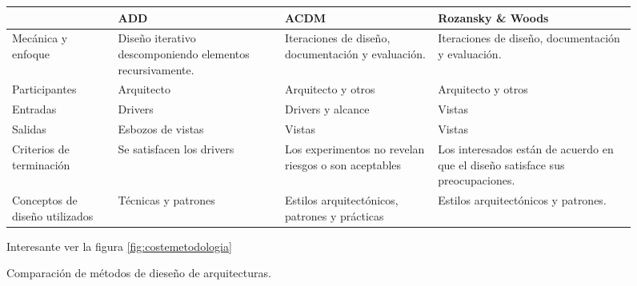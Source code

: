 \begin{figure}[h]
  \centering
  \begin{tabular}[h]{p{2.5cm} || p{3cm} | p{3cm} | p{5cm}}
    &\textbf{ADD}&\textbf{ACDM}&\textbf{Rozansky \& Woods} \\ \hline
    Mecánica y enfoque & Diseño iterativo descomponiendo elementos
                         recursivamente. & Iteraciones de diseño,
                                          documentación y
                                          evaluación. & Iteraciones de diseño,
                                                        documentación y
                                                        evaluación. \\
    Participantes & Arquitecto & Arquitecto y otros & Arquitecto y
                                                      otros \\
    Entradas & Drivers & Drivers y alcance & Vistas \\
    Salidas & Esbozos de vistas & Vistas & Vistas \\
    Criterios de terminación & Se satisfacen los drivers & Los
                                                           experimentos
                                                           no revelan
                                                           riesgos o
                                                           son
                                                           aceptables
                               & Los interesados están de acuerdo en
                                 que el diseño satisface sus
                                 preocupaciones. \\
    Conceptos de diseño utilizados & Técnicas y patrones & Estilos
                                                           arquitectónicos,
                                                           patrones y
                                                           prácticas &
                                                                       Estilos
                                                                       arquitectónicos
                                                                       y patrones.
    \end{tabular}  
  \caption[Comparación diseño arquitecturas]{Comparación de métodos de
    dieseño de arquitecturas.}
  Interesante ver la figura \ref{fig:costemetodologia}
  \label{fig:comparaciondiseñoarquitectura}
\end{figure}



